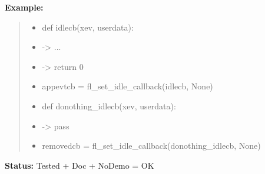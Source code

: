 \begin{boxedminipage}{\funcwidth}
\begin{quote}
      \end{quote}

\textbf{Example:}
\begin{quote}
  \begin{itemize}

  \item
    \setlength{\parskip}{0.6ex}
def idlecb(xev, userdata):



  \item {\textbar}-{\textgreater}{\textbar} ...



  \item {\textbar}-{\textgreater}{\textbar} return 0



  \item appevtcb = fl\_set\_idle\_callback(idlecb, None)



  \item def donothing\_idlecb(xev, userdata):



  \item {\textbar}-{\textgreater}{\textbar} pass



  \item removedcb = fl\_set\_idle\_callback(donothing\_idlecb, None)



\end{itemize}

\end{quote}

\textbf{Status:} Tested + Doc + NoDemo = OK



    \end{boxedminipage}

    \label{xformslib:flxbasic:fl_addto_selected_xevent}

    \vspace{0.5ex}

